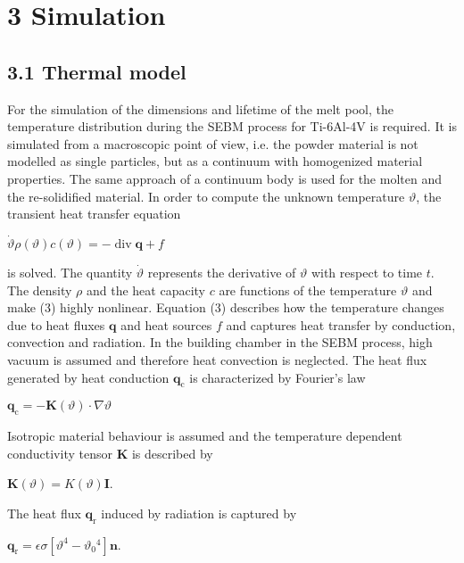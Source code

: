 \documentclass[10pt]{article}
\begin{document}
\section*{3 Simulation}
\subsection*{3.1 Thermal model}
For the simulation of the dimensions and lifetime of the melt pool, the temperature distribution during the SEBM process for Ti-6Al-4V is required. It is simulated from a macroscopic point of view, i.e. the powder material is not modelled as single particles, but as a continuum with homogenized material properties. The same approach of a continuum body is used for the molten and the re-solidified material. In order to compute the unknown temperature $\vartheta$, the transient heat transfer equation

$\dot{\vartheta} \rho(\vartheta) c(\vartheta)=-\operatorname{div} \boldsymbol{q}+f$

is solved. The quantity $\dot{\vartheta}$ represents the derivative of $\vartheta$ with respect to time $t$. The density $\rho$ and the heat capacity $c$ are functions of the temperature $\vartheta$ and make (3) highly nonlinear. Equation (3) describes how the temperature changes due to heat fluxes $\boldsymbol{q}$ and heat sources $f$ and captures heat transfer by conduction, convection and radiation. In the building chamber in the SEBM process, high vacuum is assumed and therefore heat convection is neglected. The heat flux generated by heat conduction $\boldsymbol{q}_{\mathrm{c}}$ is characterized by Fourier's law

$\boldsymbol{q}_{\mathrm{c}}=-\boldsymbol{K}(\vartheta) \cdot \nabla \vartheta$

Isotropic material behaviour is assumed and the temperature dependent conductivity tensor $\boldsymbol{K}$ is described by

$\boldsymbol{K}(\vartheta)=K(\vartheta) \boldsymbol{I}$.

The heat flux $\boldsymbol{q}_{\mathrm{r}}$ induced by radiation is captured by

$\boldsymbol{q}_{\mathrm{r}}=\epsilon \sigma\left[\vartheta^{4}-\vartheta_{0}{ }^{4}\right] \boldsymbol{n}$.
\end{document}
